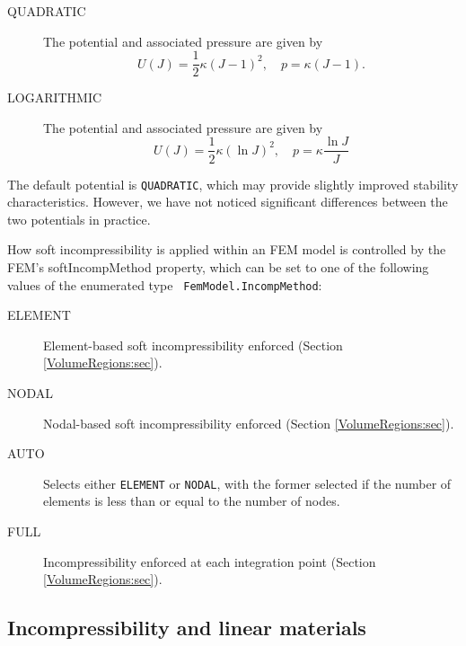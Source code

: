 \begin{description}

\item[QUADRATIC] The potential and associated pressure
are given by
%
\begin{equation}
U(J) = \frac{1}{2}\kappa (J - 1)^2, \quad p = \kappa (J - 1).
\end{equation}
%

\item[LOGARITHMIC]
The potential and associated pressure
are given by
%
\begin{equation}
U(J) = \frac{1}{2}\kappa (\ln J)^2, \quad p = \kappa \frac{\ln J}{J}
\end{equation}
%

\end{description}

The default potential is {\tt QUADRATIC}, which may provide slightly
improved stability characteristics.  However, we have not noticed
significant differences between the two potentials in practice.

How soft incompressibility is applied within an FEM model is controlled
by the FEM's {\sf softIncompMethod} property, which can be set to one
of the following values of the enumerated type {\tt
FemModel.IncompMethod}:

\begin{description}

\item[ELEMENT] Element-based soft incompressibility enforced
(Section \ref{VolumeRegions:sec}).

\item[NODAL] Nodal-based soft incompressibility enforced
(Section \ref{VolumeRegions:sec}).

\item[AUTO] Selects either {\tt ELEMENT} or {\tt NODAL},
with the former selected if the number of elements is less than or
equal to the number of nodes.

\item[FULL] Incompressibility enforced at each integration point
(Section \ref{VolumeRegions:sec}).

\end{description}

\subsection{Incompressibility and linear materials}
\label{IncompLinearMaterials:sec}

